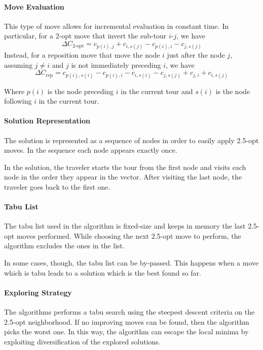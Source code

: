 \documentclass{article}
\begin{document}
\paragraph{Move Evaluation}
This type of move allows for incremental evaluation in constant time.
In particular, for a 2-opt move that invert the sub-tour $i$-$j$, we have
$$ \Delta C_{\textrm{2-opt}} = c_{p(i), j} + c_{i, s(j)} - c_{p(i), i} - c_{j, s(j)} $$
Instead, for a reposition move that move the node $i$ just after the node $j$, assuming $j \neq i$ and $j$ is not immediately preceding $i$, we have
$$ \Delta C_{\textrm{rep}} = c_{p(i), s(i)} - c_{p(i), i} - c_{i, s(i)} - c_{j, s(j)} + c_{j, i} + c_{i, s(j)} $$

Where $p(i)$ is the node preceding $i$ in the current tour and $s(i)$ is the node following $i$ in the current tour.

\paragraph{Solution Representation}
The solution is represented as a sequence of nodes in order to easily apply 2.5-opt moves.
In the sequence each node appears exactly once.

In the solution, the traveler starts the tour from the first node and visits each node in the order they appear in the vector.
After visiting the last node, the traveler goes back to the first one.

\paragraph{Tabu List}
The tabu list used in the algorithm is fixed-size and keeps in memory the last 2.5-opt moves performed.
While choosing the next 2.5-opt move to perform, the algorithm excludes the ones in the list.

In some cases, though, the tabu list can be by-passed.
This happens when a move which is tabu leads to a solution which is the best found so far.

\paragraph{Exploring Strategy}
The algorithms performs a tabu search using the steepest descent criteria on the 2.5-opt neighborhood.
If no improving moves can be found, then the algorithm picks the worst one.
In this way, the algorithm can escape the local minima by exploiting diversification of the explored solutions.
\end{document}
